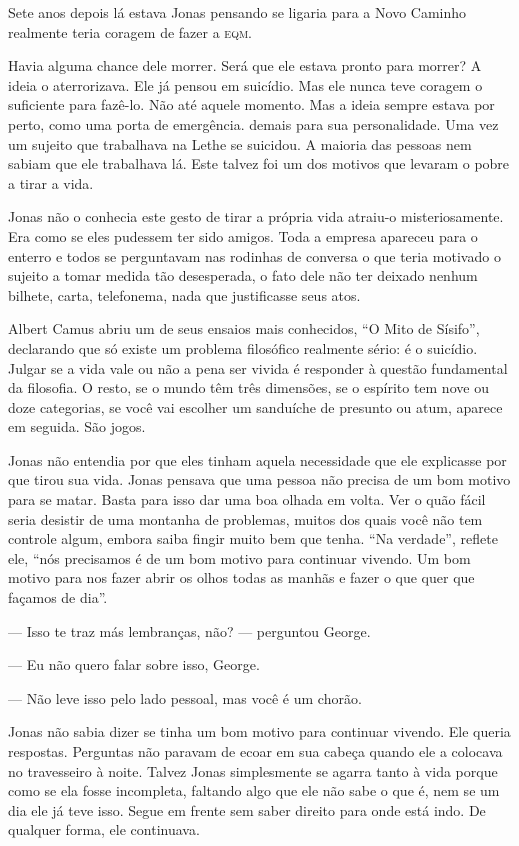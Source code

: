 Sete anos depois lá estava Jonas pensando se ligaria para a Novo Caminho realmente teria coragem de fazer a \textsc{eqm}.

Havia alguma chance dele morrer. Será que ele estava pronto para morrer? A ideia o aterrorizava. Ele já pensou em suicídio. Mas ele nunca teve coragem o suficiente para fazê-lo. Não até aquele momento. Mas a ideia sempre estava por perto, como uma porta de emergência.  demais para sua personalidade. Uma vez um sujeito que trabalhava na Lethe se suicidou. A maioria das pessoas nem sabiam que ele trabalhava lá. Este talvez foi um dos motivos que levaram o pobre a tirar a vida.

Jonas não o conhecia este gesto de tirar a própria vida atraiu-o misteriosamente. Era como se eles pudessem ter sido amigos. Toda a empresa apareceu para o enterro e todos se perguntavam nas rodinhas de conversa o que teria motivado o sujeito a tomar medida tão desesperada,  o fato dele não ter deixado nenhum bilhete, carta, telefonema, nada que justificasse seus atos.

Albert Camus abriu um de seus ensaios mais conhecidos, ``O Mito de Sísifo'', declarando que só existe um problema filosófico realmente sério: é o suicídio. Julgar se a vida vale ou não a pena ser vivida é responder à questão fundamental da filosofia. O resto, se o mundo têm três dimensões, se o espírito tem nove ou doze categorias, se você vai escolher um sanduíche de presunto ou atum, aparece em seguida. São jogos.

Jonas não entendia por que eles tinham aquela necessidade que ele explicasse por que tirou sua vida. Jonas pensava que uma pessoa não precisa de um bom motivo para se matar. Basta para isso dar uma boa olhada em volta. Ver o quão fácil seria desistir de uma montanha de problemas, muitos dos quais você não tem controle algum, embora saiba fingir muito bem que tenha. ``Na verdade'', reflete ele, ``nós precisamos é de um bom motivo para continuar vivendo. Um bom motivo para nos fazer abrir os olhos todas as manhãs e fazer o que quer que façamos de dia''.

--- Isso te traz más lembranças, não? --- perguntou George.

--- Eu não quero falar sobre isso, George.

--- Não leve isso pelo lado pessoal, mas você é um chorão.

Jonas não sabia dizer se tinha um bom motivo para continuar vivendo. Ele queria respostas. Perguntas não paravam de ecoar em sua cabeça quando ele a colocava no travesseiro à noite. Talvez Jonas simplesmente se agarra tanto à vida porque  como se ela fosse incompleta, faltando algo que ele não sabe o que é, nem se um dia ele já teve isso. Segue em frente sem saber direito para onde está indo. De qualquer forma, ele continuava.

